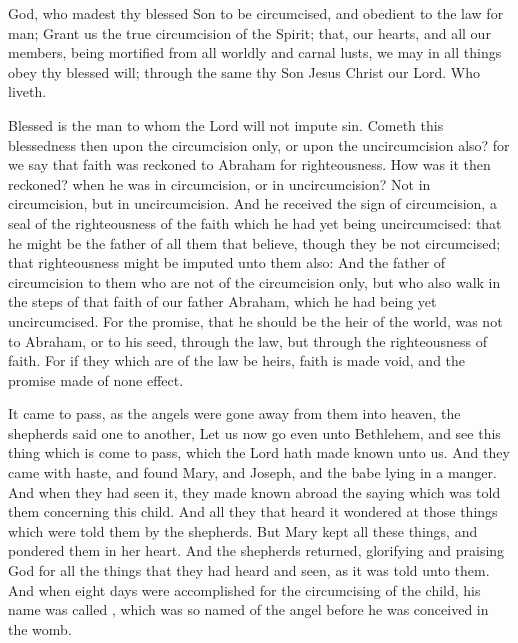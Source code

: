 \collect
{} God, who madest thy blessed Son to be circumcised, and obedient to the law for man; Grant us the true circumcision of the Spirit; that, our hearts, and all our members, being mortified from all worldly and carnal lusts, we may in all things obey thy blessed will; through the same thy Son Jesus Christ our Lord. Who liveth.

 Blessed is the man to whom the Lord will not impute sin. Cometh this blessedness then upon the circumcision only, or upon the uncircumcision also? for we say that faith was reckoned to Abraham for righteousness. How was it then reckoned? when he was in circumcision, or in uncircumcision? Not in circumcision, but in uncircumcision. And he received the sign of circumcision, a seal of the righteousness of the faith which he had yet being uncircumcised: that he might be the father of all them that believe, though they be not circumcised; that righteousness might be imputed unto them also: And the father of circumcision to them who are not of the circumcision only, but who also walk in the steps of that faith of our father Abraham, which he had being yet uncircumcised. For the promise, that he should be the heir of the world, was not to Abraham, or to his seed, through the law, but through the righteousness of faith. For if they which are of the law be heirs, faith is made void, and the promise made of none effect.



 It came to pass, as the angels were gone away from them into heaven, the shepherds said one to another, Let us now go even unto Bethlehem, and see this thing which is come to pass, which the Lord hath made known unto us. And they came with haste, and found Mary, and Joseph, and the babe lying in a manger. And when they had seen it, they made known abroad the saying which was told them concerning this child. And all they that heard it wondered at those things which were told them by the shepherds. But Mary kept all these things, and pondered them in her heart. And the shepherds returned, glorifying and praising God for all the things that they had heard and seen, as it was told unto them. And when eight days were accomplished for the circumcising of the child, his name was called , which was so named of the angel before he was conceived in the womb.

